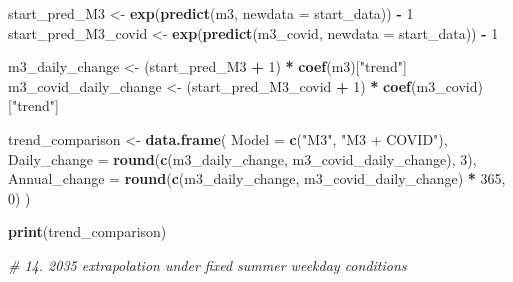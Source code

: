 \documentclass[
]{article}
\newenvironment{Shaded}{\begin{snugshade}}{\end{snugshade}}
\newcommand{\AttributeTok}[1]{\textcolor[rgb]{0.13,0.29,0.53}{#1}}
\newcommand{\CommentTok}[1]{\textcolor[rgb]{0.56,0.35,0.01}{\textit{#1}}}
\newcommand{\DecValTok}[1]{\textcolor[rgb]{0.00,0.00,0.81}{#1}}
\newcommand{\FunctionTok}[1]{\textcolor[rgb]{0.13,0.29,0.53}{\textbf{#1}}}
\newcommand{\NormalTok}[1]{#1}
\newcommand{\OtherTok}[1]{\textcolor[rgb]{0.56,0.35,0.01}{#1}}
\newcommand{\SpecialCharTok}[1]{\textcolor[rgb]{0.81,0.36,0.00}{\textbf{#1}}}
\newcommand{\StringTok}[1]{\textcolor[rgb]{0.31,0.60,0.02}{#1}}
\begin{document}
\begin{Shaded}
\begin{Highlighting}[]
\NormalTok{start\_pred\_M3 }\OtherTok{\textless{}{-}} \FunctionTok{exp}\NormalTok{(}\FunctionTok{predict}\NormalTok{(m3, }\AttributeTok{newdata =}\NormalTok{ start\_data)) }\SpecialCharTok{{-}} \DecValTok{1}
\NormalTok{start\_pred\_M3\_covid }\OtherTok{\textless{}{-}} \FunctionTok{exp}\NormalTok{(}\FunctionTok{predict}\NormalTok{(m3\_covid, }\AttributeTok{newdata =}\NormalTok{ start\_data)) }\SpecialCharTok{{-}} \DecValTok{1}

\NormalTok{m3\_daily\_change }\OtherTok{\textless{}{-}}\NormalTok{ (start\_pred\_M3 }\SpecialCharTok{+} \DecValTok{1}\NormalTok{) }\SpecialCharTok{*} \FunctionTok{coef}\NormalTok{(m3)[}\StringTok{"trend"}\NormalTok{]}
\NormalTok{m3\_covid\_daily\_change }\OtherTok{\textless{}{-}}\NormalTok{ (start\_pred\_M3\_covid }\SpecialCharTok{+} \DecValTok{1}\NormalTok{) }\SpecialCharTok{*} \FunctionTok{coef}\NormalTok{(m3\_covid)[}\StringTok{"trend"}\NormalTok{]}

\NormalTok{trend\_comparison }\OtherTok{\textless{}{-}} \FunctionTok{data.frame}\NormalTok{(}
  \AttributeTok{Model =} \FunctionTok{c}\NormalTok{(}\StringTok{"M3"}\NormalTok{, }\StringTok{"M3 + COVID"}\NormalTok{),}
  \AttributeTok{Daily\_change =} \FunctionTok{round}\NormalTok{(}\FunctionTok{c}\NormalTok{(m3\_daily\_change, m3\_covid\_daily\_change), }\DecValTok{3}\NormalTok{),}
  \AttributeTok{Annual\_change =} \FunctionTok{round}\NormalTok{(}\FunctionTok{c}\NormalTok{(m3\_daily\_change, m3\_covid\_daily\_change) }\SpecialCharTok{*} \DecValTok{365}\NormalTok{, }\DecValTok{0}\NormalTok{)}
\NormalTok{)}

\FunctionTok{print}\NormalTok{(trend\_comparison)}

\CommentTok{\# 14. 2035 extrapolation under fixed summer weekday conditions}


\end{Highlighting}
\end{Shaded}
\end{document}
